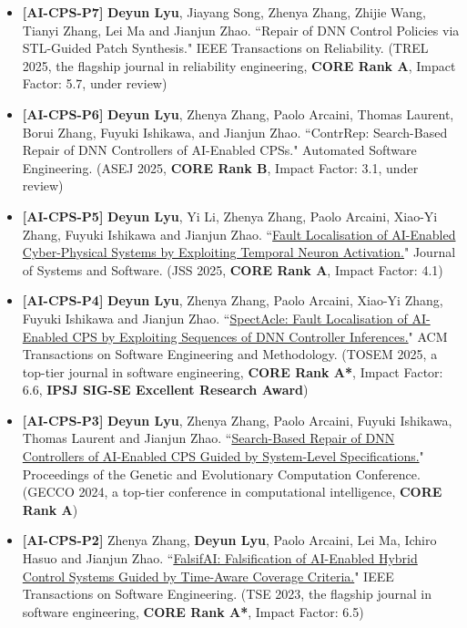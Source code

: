 \documentclass[11pt,a4paper]{moderncv}        %
\newcommand{\highlight}[1]{\textcolor{deepPurple}{\textbf{#1}}}
\begin{document}
\begin{itemize}
    \item \hypertarget{pub:AI-CPS-P7}{}\textbf{[AI-CPS-P7]} \textbf{Deyun Lyu}, Jiayang Song, Zhenya Zhang, Zhijie Wang, Tianyi Zhang, Lei Ma and Jianjun Zhao. ``Repair of DNN Control Policies via STL-Guided Patch Synthesis." IEEE Transactions on Reliability. (TREL 2025, the flagship journal in reliability engineering, \highlight{CORE Rank A}, Impact Factor: 5.7, under review)
    \item \hypertarget{pub:AI-CPS-P6}{}\textbf{[AI-CPS-P6]} \textbf{Deyun Lyu}, Zhenya Zhang, Paolo Arcaini, Thomas Laurent, Borui Zhang, Fuyuki Ishikawa, and Jianjun Zhao. ``ContrRep: Search-Based Repair of DNN Controllers of AI-Enabled CPSs." Automated Software Engineering. (ASEJ 2025, \highlight{CORE Rank B}, Impact Factor: 3.1, under review)
    \item \hypertarget{pub:AI-CPS-P5}{}\textbf{[AI-CPS-P5]} \textbf{Deyun Lyu}, Yi Li, Zhenya Zhang, Paolo Arcaini, Xiao-Yi Zhang, Fuyuki Ishikawa and Jianjun Zhao. ``\href{https://www.sciencedirect.com/science/article/abs/pii/S0164121225001438}{Fault Localisation of AI-Enabled Cyber-Physical Systems by Exploiting Temporal Neuron Activation.}" Journal of Systems and Software. (JSS 2025, \highlight{CORE Rank A}, Impact Factor: 4.1) 
    \item \hypertarget{pub:AI-CPS-P4}{}\textbf{[AI-CPS-P4]} \textbf{Deyun Lyu}, Zhenya Zhang, Paolo Arcaini, Xiao-Yi Zhang, Fuyuki Ishikawa and Jianjun Zhao. ``\href{https://dl.acm.org/doi/10.1145/3705307}{SpectAcle: Fault Localisation of AI-Enabled CPS by Exploiting Sequences of DNN Controller Inferences.}" ACM Transactions on Software Engineering and Methodology. (TOSEM 2025, a top-tier journal in software engineering, \highlight{CORE Rank A*}, Impact Factor: 6.6, \highlight{IPSJ SIG-SE Excellent Research Award})
    \item \hypertarget{pub:AI-CPS-P3}{}\textbf{[AI-CPS-P3]} \textbf{Deyun Lyu}, Zhenya Zhang, Paolo Arcaini, Fuyuki Ishikawa, Thomas Laurent and Jianjun Zhao. ``\href{https://dl.acm.org/doi/10.1145/3638529.3654078}{Search-Based Repair of DNN Controllers of AI-Enabled CPS Guided by System-Level Specifications.}"  Proceedings of the Genetic and Evolutionary Computation Conference. (GECCO 2024, a top-tier conference in computational intelligence, \highlight{CORE Rank A})
    \item \hypertarget{pub:AI-CPS-P2}{}\textbf{[AI-CPS-P2]} Zhenya Zhang, \textbf{Deyun Lyu}, Paolo Arcaini, Lei Ma, Ichiro Hasuo and Jianjun Zhao. ``\href{https://ieeexplore.ieee.org/document/9844247}{FalsifAI: Falsification of AI-Enabled Hybrid Control Systems Guided by Time-Aware Coverage Criteria.}" IEEE Transactions on Software Engineering. (TSE 2023, the flagship journal in software engineering, \highlight{CORE Rank A*}, Impact Factor: 6.5)

\end{itemize}
\end{document}
